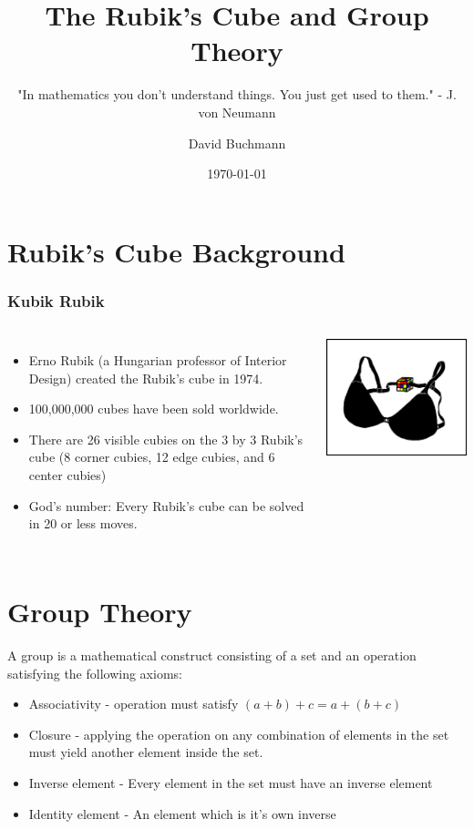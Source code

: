 \documentclass[xcolor=pdftex,dvipsnames,table]{beamer}
\title{The Rubik's Cube and Group Theory}
\subtitle{"In mathematics you don’t understand things. You just get used to them." - J. von Neumann}
\author{David Buchmann}
\institute{Cisco Systems}
\date{\today}
\begin{document}
\maketitle

\section{Rubik's Cube Background}
\begin{frame}
  \frametitle{Kubik Rubik}
  \begin{columns}[cc]
    \column{2.5in}
    \begin{itemize}
    \item Erno Rubik (a Hungarian professor of Interior Design) created the Rubik's cube in 1974.
    \item 100,000,000 cubes have been sold worldwide.
    \item There are 26 visible cubies on the 3 by 3 Rubik's cube (8 corner cubies, 12 edge cubies, and 6 center cubies)
    \item God's number: Every Rubik's cube can be solved in 20 or less moves.
  \end{itemize}
    \column{0.5in}
    \includegraphics[scale=0.33]{rubik_frustration.png}
  \end{columns}
\end{frame}

\section{Group Theory}
\begin{frame}
  A group is a mathematical construct consisting of a set and an operation satisfying the following axioms:
  \begin{itemize}
    \item Associativity - operation must satisfy $(a + b) + c = a + (b + c)$
    \item Closure - applying the operation on any combination of elements in the set must yield another element inside the set.
    \item Inverse element - Every element in the set must have an inverse element
    \item Identity element - An element which is it's own inverse
  \end{itemize}
\end{frame}
\end{document}
